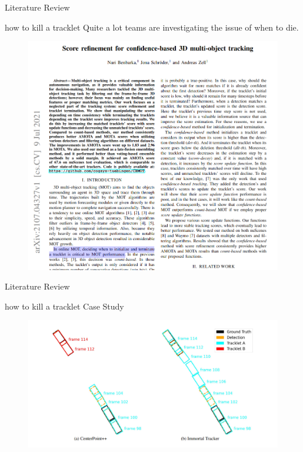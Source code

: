 
\begin{frame}{Literature Review}
    \begin{block}{how to kill a tracklet}
        Quite a lot teams are investigating the issue of when to die.
        \href{https://arxiv.org/pdf/2107.04327.pdf}{}
        \begin{figure}
        \includegraphics[width=0.4\linewidth]{termination/1.png}
        \end{figure}
    \end{block}
    \end{frame}
    
    \begin{frame}{Literature Review}
    \begin{block}{how to kill a tracklet}
        Case Study \href{https://arxiv.org/pdf/2111.13672.pdf}{}
        \begin{figure}
        \includegraphics[width=0.9\linewidth]{termination/2.png}
        \end{figure}
    \end{block}
    \end{frame}
    

